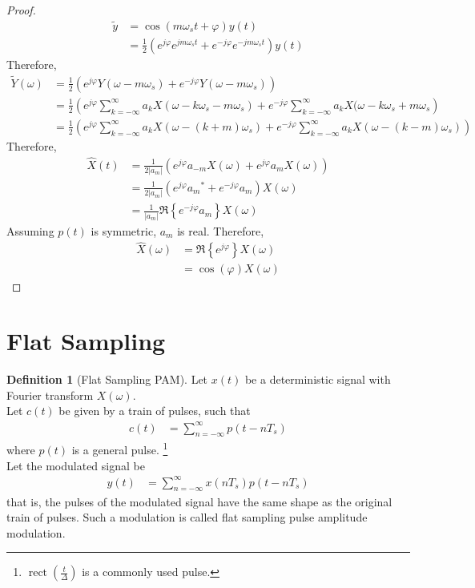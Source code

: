 \documentclass[titlepage, fleqn, a4paper, 12pt, twoside]{article}
\theoremstyle{definition}
\newtheorem{definition}{Definition}
\theoremstyle{theorem}
\renewcommand{\tilde}{\widetilde}
\DeclareMathOperator{\rect}{\mathrm{rect}}
\begin{document}
\begin{proof}
	\begin{align*}
		\tilde{y} &= \cos(m \omega_s t + \varphi) y(t)\\
		&= \frac{1}{2} \left( e^{j \varphi} e^{j m \omega_s t} + e^{-j \varphi} e^{-j m \omega_s t} \right) y(t)
	\end{align*}
	Therefore,
	\begin{align*}
		\tilde{Y}(\omega) &= \frac{1}{2} \left( e^{j \varphi} Y(\omega - m \omega_s) + e^{-j \varphi} Y(\omega - m \omega_s) \right)\\
		&= \frac{1}{2} \left( e^{j \varphi} \sum\limits_{k = -\infty}^{\infty} a_k X(\omega - k \omega_s - m \omega_s) + e^{-j \varphi} \sum\limits_{k = -\infty}^{\infty} a_k X(\omega - k \omega_s + m \omega_s \right)\\
		&= \frac{1}{2} \left( e^{j \varphi} \sum\limits_{k = -\infty}^{\infty} a_k X\left( \omega - (k + m) \omega_s \right) + e^{-j \varphi} \sum\limits_{k = -\infty}^{\infty} a_k X\left( \omega - (k - m) \omega_s \right) \right)
	\end{align*}
	Therefore,
	\begin{align*}
		\hat{X}(t) &= \frac{1}{2 |a_m|} \left( e^{j \varphi} a_{-m} X(\omega) + e^{j \varphi} a_m X(\omega) \right)\\
		&= \frac{1}{2 |a_m|} \left( e^{j \varphi} {a_m}^* + e^{-j \varphi} a_m \right) X(\omega)\\
		&= \frac{1}{|a_m|} \Re\left\{ e^{-j \varphi} a_m \right\} X(\omega)
	\end{align*}
	Assuming $p(t)$ is symmetric, $a_m$ is real.
	Therefore,
	\begin{align*}
		\hat{X}(\omega) &= \Re\left\{ e^{j \varphi} \right\} X(\omega)\\
		&= \cos(\varphi) X(\omega)
	\end{align*}
\end{proof}

\section{Flat Sampling}

\begin{definition}[Flat Sampling PAM]
	Let $x(t)$ be a deterministic signal with Fourier transform $X(\omega)$.\\
	Let $c(t)$ be given by a train of pulses, such that
	\begin{align*}
		c(t) &= \sum\limits_{n = -\infty}^{\infty} p(t - n T_s)
	\end{align*}
	where $p(t)$ is a general pulse.
	\footnote{$\rect\left( \frac{t}{\Delta} \right)$ is a commonly used pulse.}\\
	Let the modulated signal be
	\begin{align*}
		y(t) &= \sum\limits_{n = -\infty}^{\infty} x(n T_s) p(t - n T_s)
	\end{align*}
	that is, the pulses of the modulated signal have the same shape as the original train of pulses.
	Such a modulation is called flat sampling pulse amplitude modulation.
	\label{def:flat_sampling_PAM}
\end{definition}
\end{document}
